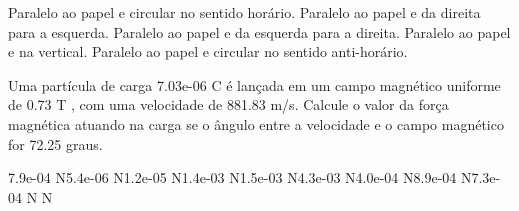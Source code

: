 \documentclass[12pt, addpoints]{exam}
\begin{document}
\begin{questions}
\begin{multicols*}{2}
\begin{choices}
\choice Paralelo ao papel e circular no sentido horário. 
\choice Paralelo ao papel e da direita para a esquerda. 
\choice Paralelo ao papel e da esquerda para a direita. 
\choice Paralelo ao papel e na vertical. 
\choice Paralelo ao papel e circular no sentido anti-horário. 
\end{choices}
\question Uma partícula de carga 7.03e-06 C é lançada em um campo magnético uniforme de    0.73 T , com uma velocidade de 881.83 m/s. Calcule o valor da força magnética atuando na carga se o ângulo entre a velocidade e o campo magnético for   72.25 graus.

\begin{oneparchoices}
\choice 7.9e-04 N\choice 5.4e-06 N\choice 1.2e-05 N\choice 1.4e-03 N\choice 1.5e-03 N\choice 4.3e-03 N\choice 4.0e-04 N\choice 8.9e-04 N\choice 7.3e-04 N N
\end{oneparchoices}\end{multicols*}
\end{questions}
\newpage
\end{document}
